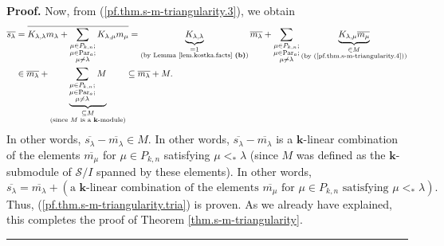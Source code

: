 \documentclass[numbers=enddot,12pt,final,onecolumn,notitlepage]{scrartcl}%
\theoremstyle{definition}
\newenvironment{proof}[1][Proof]{\noindent\textbf{#1.} }{\ \rule{0.5em}{0.5em}}
\let\sumnonlimits\sum
\renewcommand{\sum}{\sumnonlimits\limits}
\begin{document}
\begin{proof}
Now, from (\ref{pf.thm.s-m-triangularity.3}), we obtain%
\begin{align*}
\overline{s_{\lambda}}  &  =\overline{K_{\lambda,\lambda}m_{\lambda}%
+\sum_{\substack{\mu\in P_{k,n};\\\mu\in\operatorname*{Par}\nolimits_{a}%
;\\\mu\neq\lambda}}K_{\lambda,\mu}m_{\mu}}=\underbrace{K_{\lambda,\lambda}%
}_{\substack{=1\\\text{(by Lemma \ref{lem.kostka.facts} \textbf{(b)})}%
}}\overline{m_{\lambda}}+\sum_{\substack{\mu\in P_{k,n};\\\mu\in
\operatorname*{Par}\nolimits_{a};\\\mu\neq\lambda}}\underbrace{K_{\lambda,\mu
}\overline{m_{\mu}}}_{\substack{\in M\\\text{(by
(\ref{pf.thm.s-m-triangularity.4}))}}}\\
&  \in\overline{m_{\lambda}}+\underbrace{\sum_{\substack{\mu\in P_{k,n}%
;\\\mu\in\operatorname*{Par}\nolimits_{a};\\\mu\neq\lambda}}M}%
_{\substack{\subseteq M\\\text{(since }M\text{ is a }\mathbf{k}\text{-module)}%
}}\subseteq\overline{m_{\lambda}}+M.
\end{align*}
In other words, $\overline{s_{\lambda}}-\overline{m_{\lambda}}\in M$. In other
words, $\overline{s_{\lambda}}-\overline{m_{\lambda}}$ is a $\mathbf{k}%
$-linear combination of the elements $\overline{m_{\mu}}$ for $\mu\in P_{k,n}$
satisfying $\mu<_{\ast}\lambda$ (since $M$ was defined as the $\mathbf{k}%
$-submodule of $\mathcal{S}/I$ spanned by these elements). In other words,%
\[
\overline{s_{\lambda}}=\overline{m_{\lambda}}+\left(  \text{a }\mathbf{k}%
\text{-linear combination of the elements }\overline{m_{\mu}}\text{ for }%
\mu\in P_{k,n}\text{ satisfying }\mu<_{\ast}\lambda\right)  .
\]
Thus, (\ref{pf.thm.s-m-triangularity.tria}) is proven. As we already have
explained, this completes the proof of Theorem \ref{thm.s-m-triangularity}.
\end{proof}
\end{document}
